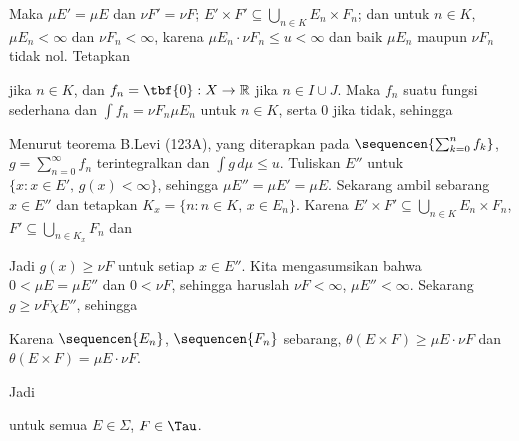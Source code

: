 {


\noindent Maka $\mu E'=\mu E$ dan $\nu F'=\nu F$;
$E'\times F'\subseteq\bigcup_{n\in K}E_n\times F_n$; dan untuk $n\in K$,
$\mu E_n<\infty$ dan $\nu F_n<\infty$, karena
$\mu E_n\cdot\nu F_n\le u<\infty$ dan
baik $\mu E_n$ maupun $\nu F_n$ tidak nol. Tetapkan


\noindent jika $n\in K$, dan $f_n=\tbf{0}:X\to\Bbb R$ jika $n\in I\cup J$.
Maka $f_n$ suatu fungsi sederhana dan
$\int f_n=\nu F_n\mu E_n$ untuk $n\in K$, serta $0$ jika tidak, sehingga


\noindent Menurut teorema B.Levi (123A), yang diterapkan pada
$\sequencen{\sum_{k=0}^nf_k}$,
$g=\sum_{n=0}^{\infty}f_n$ terintegralkan dan $\int g\,d\mu\le u$.
Tuliskan $E''$ untuk $\{x:x\in E',\,g(x)<\infty\}$, sehingga
$\mu E''=\mu E'=\mu E$. Sekarang ambil sebarang $x\in E''$ dan tetapkan
$K_x=\{n:n\in K,\,x\in E_n\}$. Karena
$E'\times F'\subseteq\bigcup_{n\in K}E_n\times F_n$,
$F'\subseteq\bigcup_{n\in K_x}F_n$ dan


\noindent Jadi $g(x)\ge\nu F$ untuk setiap $x\in E''$. Kita
mengasumsikan bahwa $0<\mu E=\mu E''$ dan $0<\nu F$, sehingga haruslah
$\nu F<\infty$, $\mu E''<\infty$. Sekarang $g\ge\nu F\chi E''$, sehingga


\noindent Karena $\sequencen{E_n}$, $\sequencen{F_n}$ sebarang,
$\theta(E\times F)\ge\mu E\cdot\nu F$ dan
$\theta(E\times F)=\mu E\cdot\nu F$.\ \Qed

Jadi


\noindent untuk semua $E\in\Sigma$, $F\in\Tau$.
}%



